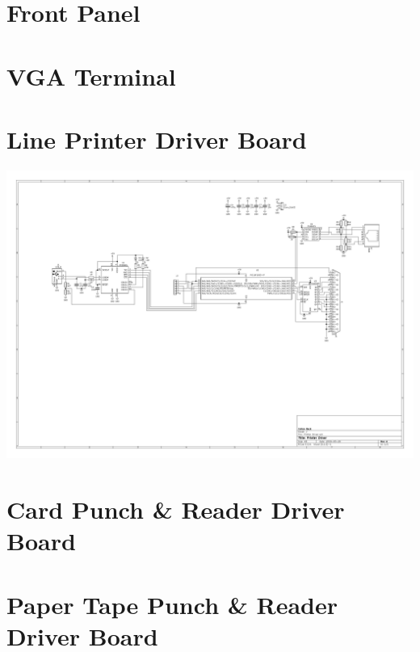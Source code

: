\documentclass{book}
\begin{document}
\section{Front Panel}
\cleardoublepage
\section{VGA Terminal}
\cleardoublepage
\section{Line Printer Driver Board}
\begin{sideways}
\centering
\includegraphics[height=1.1\textwidth]{../Board_Layouts/Printer_Driver/Printer_Driver.pdf}
\end{sideways}
\cleardoublepage
\section{Card Punch \& Reader Driver Board}
\cleardoublepage
\section{Paper Tape Punch \& Reader Driver Board}
\end{document}
